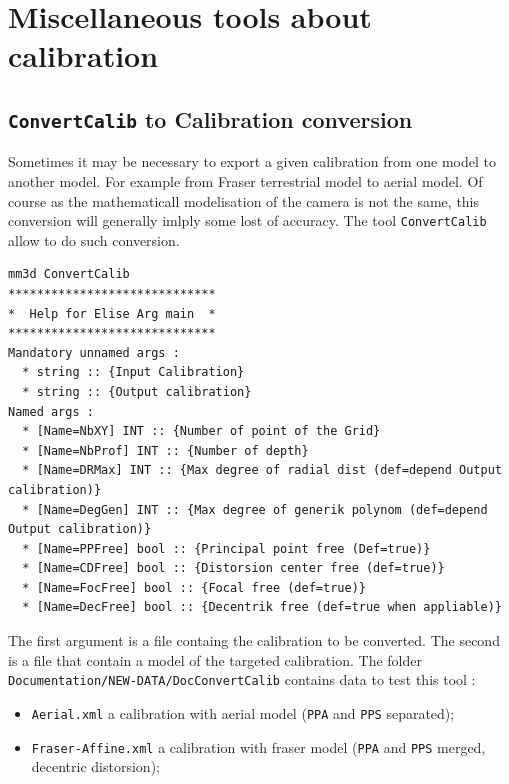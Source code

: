 
\section{Miscellaneous  tools about calibration}


\subsection{{\tt ConvertCalib} to Calibration conversion}

Sometimes it may be necessary to export a given calibration from one model to another model. For example from Fraser terrestrial
model to aerial model. Of course as the mathematicall modelisation of the camera is not the same, this conversion will 
generally imlply some lost of accuracy.  The tool {\tt ConvertCalib} allow to do such conversion.

\begin{verbatim}
mm3d ConvertCalib
*****************************
*  Help for Elise Arg main  *
*****************************
Mandatory unnamed args : 
  * string :: {Input Calibration}
  * string :: {Output calibration}
Named args : 
  * [Name=NbXY] INT :: {Number of point of the Grid}
  * [Name=NbProf] INT :: {Number of depth}
  * [Name=DRMax] INT :: {Max degree of radial dist (def=depend Output calibration)}
  * [Name=DegGen] INT :: {Max degree of generik polynom (def=depend Output calibration)}
  * [Name=PPFree] bool :: {Principal point free (Def=true)}
  * [Name=CDFree] bool :: {Distorsion center free (def=true)}
  * [Name=FocFree] bool :: {Focal free (def=true)}
  * [Name=DecFree] bool :: {Decentrik free (def=true when appliable)}
\end{verbatim}


The first argument is a file containg the calibration to be converted. The second is a file that contain a model of the
targeted calibration. The folder {\tt Documentation/NEW-DATA/DocConvertCalib} contains data to test this tool :

\begin{itemize}
   \item  {\tt Aerial.xml} a calibration with aerial model ({\tt PPA} and {\tt PPS} separated);
   \item  {\tt Fraser-Affine.xml} a calibration with fraser model ({\tt PPA} and {\tt PPS} merged, decentric distorsion);
\end{itemize}


